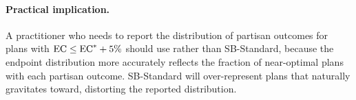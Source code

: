 \paragraph{Practical implication.}
A practitioner who needs to report the distribution of partisan outcomes for
plans with $\mathrm{EC} \leq \mathrm{EC}^* + 5\%$ should use \sbf{} rather than SB-Standard,
because the \sbf{} endpoint distribution more accurately reflects the
fraction of near-optimal plans with each partisan outcome.
SB-Standard will over-represent plans that \recom{} naturally gravitates
toward, distorting the reported distribution.
